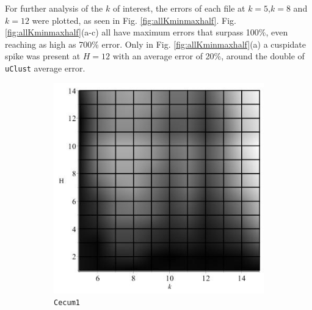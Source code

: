 \documentclass[../../main.tex]{subfiles}
\begin{document}
For further analysis of the $k$ of interest, the errors of each file at $k=5$,$k=8$ and $k=12$ were plotted, as seen in Fig. \ref{fig:allKminmaxhalf}. Fig. \ref{fig:allKminmaxhalf}(a-c) all have maximum errors that surpass 100\%, even reaching as high as 700\% error. Only in Fig. \ref{fig:allKminmaxhalf}(a) a cuspidate spike was present at $H=12$ with an average error of 20\%, around the double of \texttt{uClust} average error.\\


\begin{figure}[H]
\begin{subfigure}[b]{.5\textwidth}
\includegraphics[width=\textwidth]{precision/minmaxhalf/cecum1precise}
\caption{\texttt{Cecum1}}
\end{subfigure}
\begin{subfigure}[b]{.5\textwidth}

\end{subfigure}
\end{figure}
\end{document}
